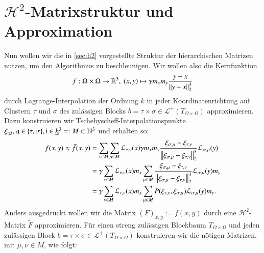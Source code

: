     \clearpage
    
  \section{$\mathcal{H}^2$-Matrixstruktur und Approximation}
  \label{sec:approxf}
    Nun wollen wir die in \autoref{sec:h2} vorgestellte Struktur der hierarchischen Matrizen nutzen, um den Algorithmus zu beschleunigen. Wir wollen also die Kernfunktion
    \[
     f: \Omega \times \Omega \to \mathbb{R}^3, \ (x,y) \mapsto \gamma m_x  m_y \frac{y - x}{\left\lVert y - x\right\rVert^3_2}
    \]
    durch Lagrange-Interpolation der Ordnung $k$ in jeder Koordinatenrichtung auf Clustern $\tau$ und $\sigma$ des zulässigen Blocks $b = \tau \times \sigma \in \mathcal{L}^+(T_{\Omega \times \Omega})$ 
    approximieren.
    Dazu konstruieren wir Tschebyscheff-Interpolationspunkte $\xi_{\mathfrak{g}, \mathfrak{i}} \text{, } \mathfrak{g} \in \{ \tau, \sigma \}, \mathfrak{i} \in \haken{k}^3 =: M \subset \N^3$
    und erhalten so:
    \begin{align*}
      f(x,y) \approx \tilde f (x,y) 
      &= \sum_{\nu \in M} \sum_{\mu \in M} \mathcal{L}_{\tau, \nu}(x) \gamma m_x m_y \frac{\xi_{\sigma, \mu} - \xi_{\tau, \nu}}{\left\lVert\xi_{\sigma, \mu} - \xi_{\tau, \nu}\right\rVert^3_2} \mathcal{L}_{\sigma, \mu}(y)\\
      &= \gamma \sum_{\nu \in M} \mathcal{L}_{\tau, \nu}(x) m_x \sum_{\mu \in M} \frac{\xi_{\sigma, \mu} - \xi_{\tau, \nu}}{\left\lVert\xi_{\sigma, \mu} - \xi_{\tau, \nu}\right\rVert^3_2} \mathcal{L}_{\sigma, \mu}(y) m_y\\
      &= \gamma \sum_{\nu \in M} \mathcal{L}_{\tau, \nu}(x) m_x \sum_{\mu \in M} P( \xi_{\tau, \nu} , \xi_{\sigma, \mu} ) \mathcal{L}_{\sigma, \mu}(y) m_y.
    \end{align*}
    Anders ausgedrückt wollen wir die Matrix $(F)_{x,y} := f(x,y)$ durch eine $\mathcal{H}^2$-Matrix $\tilde F$ approximieren. Für einen streng zulässigen Blockbaum $T_{\Omega \times \Omega}$ 
    und jeden zulässigen Block $b = \tau \times \sigma \in \mathcal{L}^+(T_{\Omega \times \Omega})$ konstruieren wir die nötigen Matrizen, mit $\mu,\nu \in M$, wie folgt:
